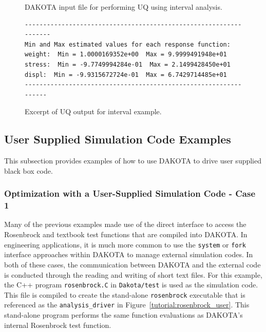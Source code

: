 \begin{figure}
  \centering
  \begin{bigbox}
    \begin{small}
    \end{small}
  \end{bigbox}
\caption{DAKOTA input file for performing UQ using interval analysis.}
\label{tutorial:interval}
\end{figure}

\begin{figure}
\centering
\begin{bigbox}
\begin{small}
\begin{verbatim}
------------------------------------------------------------------
Min and Max estimated values for each response function:
weight:  Min = 1.0000169352e+00  Max = 9.9999491948e+01
stress:  Min = -9.7749994284e-01  Max = 2.1499428450e+01
displ:  Min = -9.9315672724e-01  Max = 6.7429714485e+01
-----------------------------------------------------------------
\end{verbatim}
\end{small}
\end{bigbox}
\caption{Excerpt of UQ output for interval example.}
\label{tutorial:interval_out}
\end{figure}

\subsection{User Supplied Simulation Code Examples}\label{tutorial:example:user_supply}
This subsection provides examples of how to use DAKOTA to drive user 
supplied black box code.

\subsubsection{Optimization with a User-Supplied Simulation Code - Case 1}\label{tutorial:example:user_supply:optimization1}

Many of the previous examples made use of the direct interface to
access the Rosenbrock and textbook test functions that are compiled
into DAKOTA. In engineering applications, it is much more common to
use the \texttt{system} or \texttt{fork} interface approaches within
DAKOTA to manage external simulation codes. In both of these cases,
the communication between DAKOTA and the external code is conducted
through the reading and writing of short text files. For this example,
the C++ program \texttt{rosenbrock.C} in \texttt{Dakota/test} is used
as the simulation code.  This file is compiled to create the
stand-alone \texttt{rosenbrock} executable that is referenced as the
\texttt{analysis\_driver} in Figure~\ref{tutorial:rosenbrock_user}.
This stand-alone program performs the same function evaluations as
DAKOTA's internal Rosenbrock test function.

